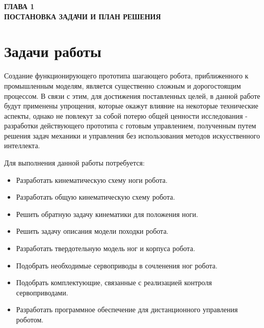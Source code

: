 

\newpage
\begin{center}
	\textbf{\large ГЛАВА 1 \\ ПОСТАНОВКА ЗАДАЧИ И ПЛАН РЕШЕНИЯ}
\end{center}


\section{Задачи работы}\label{C1_1}

Создание функционирующего прототипа шагающего робота, приближенного к промышленным моделям, является существенно сложным и дорогостоящим процессом. В связи с этим, для достижения поставленных целей, в данной работе будут применены упрощения, которые окажут влияние на некоторые технические аспекты, однако не повлекут за собой потерю общей ценности исследования - разработки действующего прототипа с готовым управлением, полученным путем решения задач механики и управления без использования методов искусственного интеллекта.


 
Для выполнения данной работы потребуется:
\begin{itemize}
	\item Разработать кинематическую схему ноги робота.
	\item Разработать общую кинематическую схему робота.
	\item Решить обратную задачу кинематики для положения ноги.
	\item Решить задачу описания модели походки робота.
	\item Разработать твердотельную модель ног и корпуса робота.
	\item Подобрать необходимые сервоприводы в сочленения ног робота.
	\item Подобрать комплектующие, связанные с реализацией контроля сервоприводами.
	\item Разработать программное обеспечение для дистанционного управления роботом.
\end{itemize}
